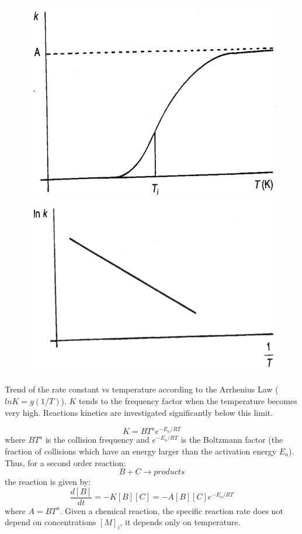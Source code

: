 \documentclass[12pt]{article}
\begin{document}
\begin{figure}[!htb]
    \centering
    \begin{minipage}{.5\textwidth}
        \centering
        \includegraphics[width=0.8\linewidth, height=0.15\textheight]{figures/arr1.png}
    \end{minipage}%
    \begin{minipage}{0.5\textwidth}
        \centering
        \includegraphics[width=0.8\linewidth, height=0.15\textheight]{figures/arr2.png}
    \end{minipage}
\end{figure}

Trend of the rate constant vs temperature according to the Arrhenius Law ($lnK=g(1/T)$). $K$ tends to the frequency factor when the temperature becomes very high. Reactions kinetics are investigated significantly below this limit.

\begin{equation}
    K=BT^{a}e^{-E_{a}/RT}
\end{equation}
where $BT^{a}$ is the collision frequency and $e^{-E_{a}/RT}$ is the Boltzmann factor (the fraction of collisions which have an energy larger than the activation energy $E_{a}$).\\
Thus, for a second order reaction:
\begin{equation}
    B+C \rightarrow products
\end{equation}
the reaction is given by:
\begin{equation}
    \frac{d[B]}{dt} = - K[B][C] = -A[B][C]e^{-E_{a}/RT}
\end{equation}
where $A=BT^{a}$.
Given a chemical reaction, the specific reaction rate does not depend on concentrations $[M]_{i}$, it depends only on temperature.
\end{document}
